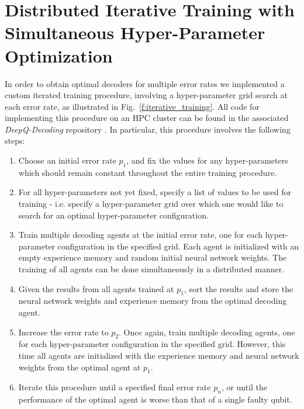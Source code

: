 \documentclass[twocolumn,preprintnumbers,amsmath,amssymb,notitlepage,nofootinbib,longbibliography,superscriptaddress,aps,pra,10pt]{revtex4-1}
\begin{document}
\appendix

\section{Distributed Iterative Training with Simultaneous Hyper-Parameter Optimization}\label{A:training}

	In order to obtain optimal decoders for multiple error rates we implemented a custom iterated training procedure, involving a hyper-parameter grid search at each error rate, as illustrated in Fig.\ \ref{f:iterative_training}. All code for implementing this procedure on an HPC cluster can be found in the associated \emph{DeepQ-Decoding} repository \cite{DeepQDecoding}. In particular, this procedure involves the following steps:

	\begin{enumerate}
		\item Choose an initial error rate $p_1$, and fix the values for any hyper-parameters which should remain constant throughout the entire training procedure.
		\item For all hyper-parameters not yet fixed, specify a list of values to be used for training - i.e. specify a hyper-parameter grid over which one would like to search for an optimal hyper-parameter configuration.
		\item Train multiple decoding agents at the initial error rate, one for each hyper-parameter configuration in the specified grid. Each agent is initialized with an empty experience memory and random initial neural network weights. The training of all agents can be done simultaneously in a distributed manner.
		\item Given the results from all agents trained at $p_1$, sort the results and store the neural network weights and experience memory from the optimal decoding agent.
		\item Increase the error rate to $p_2$. Once again, train multiple decoding agents, one for each hyper-parameter configuration in the specified grid. However, this time all agents are initialized with the experience memory and neural network weights from the optimal agent at $p_1$.
		\item Iterate this procedure until a specified final error rate $p_n$, or until the performance of the optimal agent is worse than that of a single faulty qubit.
	\end{enumerate}
\end{document}
